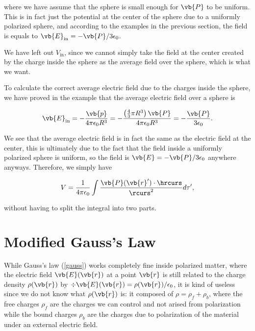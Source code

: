 \documentclass[english,a4paper,12pt]{report}
\begin{document}
where we have assume that the sphere is small enough for \(\vb{P} \) to be uniform. This is in fact just the potential at the center of the sphere due to a uniformly polarized sphere, and according to the examples in the previous section, the field is equals to \(\vb{E} _{\text{in} } = -\vb{P} /3 \epsilon_0  \). 

We have left out \(V_{\text{in} } \), since we cannot simply take the field at the center created by the charge inside the sphere as the average field over the sphere, which is what we want.

To calculate the correct average electric field due to the charges inside the sphere, we have proved in the example that the average electric field over a sphere is 

\begin{equation}
    \vb{E} _{\text{in} } = - \frac{\vb{p} }{4\pi \epsilon_0 R^3 } = -\frac{\left( \frac{4}{3}\pi R^3   \right)\vb{P} }{4\pi \epsilon_0 R^3 } = -\frac{\vb{P} }{3\epsilon_0 }.    
\end{equation}

We see that the average electric field is in fact the same as the electric field at the center, this is ultimately due to the fact that the field inside a uniformly polarized sphere is uniform, so the field is \(\vb{E} = - \vb{P} /3\epsilon_0 \) anywhere anyways. Therefore, we simply have 

\begin{equation}
    V = \frac{1}{4\pi \epsilon_0} \int \frac{\vb{P} (\vb{r} ')\cdot \hrcurs }{\rcurs ^2} d\tau ',  
\end{equation}

without having to split the integral into two parts.




\section{Modified Gauss's Law} \label{mode} 

While Gauss's law (\cref{gauss}) works completely fine inside polarized matter, where the electric field \(\vb{E} (\vb{r} )\) at a point \(\vb{r} \) is still related to the charge density \(\rho (\vb{r} )\)  by \(\div{\vb{E}(\vb{r} )} = \rho(\vb{r} ) / \epsilon_0 \), it is kind of useless since we do not know what \(\rho (\vb{r} )\) is: it composed of \(\rho = \rho _{f} + \rho _{b}  \), where the free charges \(\rho _{f} \) are the charges we can control and not arised from polarization while the bound charges \(\rho _{b} \) are the charges due to polarization of the material under an external electric field. 
\end{document}
